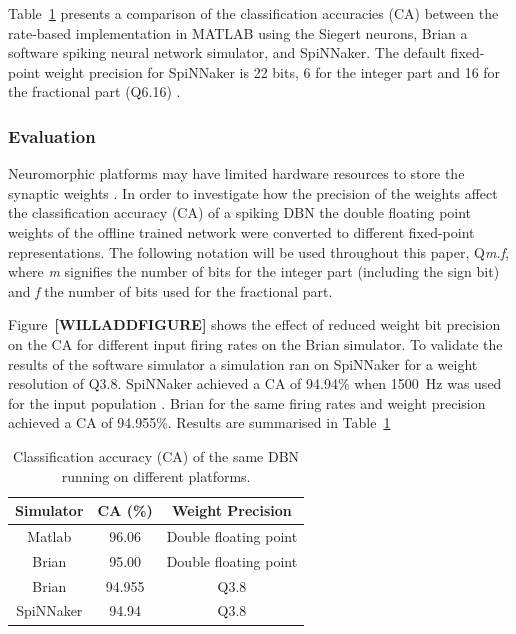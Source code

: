  
Table~\ref{tab:casimulators} presents a comparison of the classification accuracies (CA) between the rate-based implementation in MATLAB using the Siegert neurons, Brian \citep{} a software spiking neural network simulator, and SpiNNaker. The default fixed-point weight precision for SpiNNaker is 22 bits, 6 for the integer part and 16 for the fractional part (Q6.16) \citep{}.





\subsubsection{Evaluation}


Neuromorphic platforms may have limited hardware resources to store the synaptic weights \citep{Schemmel_etal10,Merolla08082014}. In order to investigate how the precision of the weights affect the classification accuracy (CA) of a spiking DBN the double floating point weights of the offline trained network were converted to different fixed-point representations. The following notation will be used throughout this paper, Q\textit{m.f}, where \textit{m} signifies the number of bits for the integer part (including the sign bit) and \textit{f} the number of bits used for the fractional part.

Figure~\textbf{[WILLADDFIGURE]} shows the effect of reduced weight bit precision on the CA for different input firing rates on the Brian simulator. To validate the results of the software simulator a simulation ran on SpiNNaker for a weight resolution of Q3.8. SpiNNaker achieved a CA of 94.94\% when 1500~Hz was used for the input population \citep{SpinnakerDBN2015,iscasSpinnakerAcceptedDemo}. Brian for the same firing rates and weight precision achieved a CA of 94.955\%. Results are summarised in Table~\ref{tab:casimulators}   


\begin{table}[h]
\caption{Classification accuracy (CA) of the same DBN running on different platforms.}
\begin{center}
\begin{tabular} {|c|c|c|}
    \hline
    \multicolumn{1}{|c|}{\textbf{Simulator}}
    & \multicolumn{1}{|c|}{\textbf{CA (\%)}}
    & \multicolumn{1}{|c|}{\textbf{Weight Precision}} \\
    \hline
    Matlab & 96.06 & Double floating point\\
    Brian & 95.00 & Double floating point\\
    Brian & 94.955 & Q3.8\\
    SpiNNaker & 94.94 & Q3.8\\
    \hline
\end{tabular}
\label{tab:casimulators}
\end{center}
\end{table}


